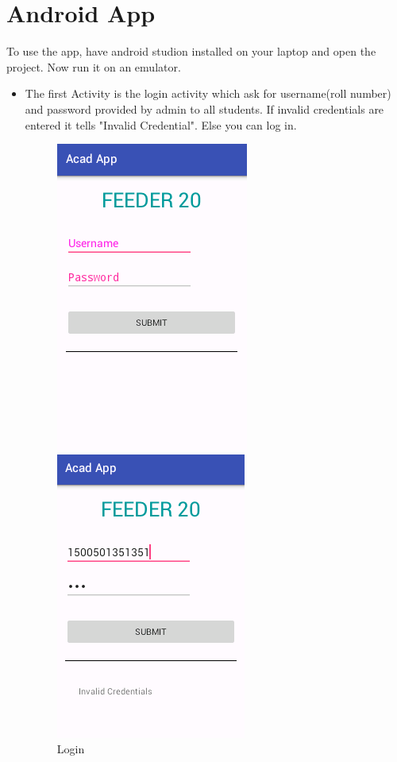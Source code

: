 \documentclass[12pt]{extreport}
\begin{document}
  \chapter*{Android App}
  To use the app, have android studion installed on your laptop and open the project. Now run it on an emulator.
  
  \begin{itemize}
  \item The first Activity is the login activity which ask for username(roll number) and password provided by admin to all students. If invalid credentials are entered it tells "Invalid Credential". Else you can log in.
  \begin{figure}[ht!]
    \centering
    \begin{minipage}{.5\textwidth}
      \centering
      \includegraphics[width=.4\linewidth]{images/appLogin.png}
      \caption{Login\label{overflow}}
    \end{minipage}%
    \begin{minipage}{.5\textwidth}
      \centering
      \includegraphics[width=.4\linewidth]{images/appinvalidLogin.png}

\end{minipage}
\end{figure}
\end{itemize}
\end{document}
